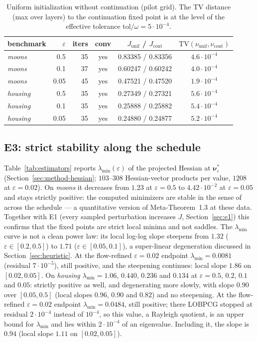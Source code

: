 \documentclass[11pt,leqno]{amsart}
\newcommand{\bnu}{\boldsymbol{\nu}}
\newcommand{\eps}{\varepsilon}
\newcommand{\TV}{\mathrm{TV}}
\numberwithin{equation}{section}
\theoremstyle{definition}
\begin{document}
\begin{table}[ht]
\centering\small
\begin{tabular}{l r rc c c}
\toprule
benchmark & $\eps$ & iters & conv & $J_{\mathrm{unif}}$ / $J_{\mathrm{cont}}$ &
$\TV(\nu_{\mathrm{unif}},\nu_{\mathrm{cont}})$\\
\midrule
\emph{moons}   & 0.5  & 35 & yes & 0.83385 / 0.83356 & $4.6\cdot10^{-4}$\\
\emph{moons}   & 0.1  & 37 & yes & 0.60247 / 0.60242 & $4.0\cdot10^{-4}$\\
\emph{moons}   & 0.05 & 45 & yes & 0.47521 / 0.47520 & $1.9\cdot10^{-4}$\\
\emph{housing} & 0.5  & 35 & yes & 0.27349 / 0.27321 & $5.6\cdot10^{-4}$\\
\emph{housing} & 0.1  & 35 & yes & 0.25888 / 0.25882 & $5.4\cdot10^{-4}$\\
\emph{housing} & 0.05 & 35 & yes & 0.24880 / 0.24877 & $5.2\cdot10^{-4}$\\
\bottomrule
\end{tabular}
\vskip 2pt
\caption{Uniform initialization without continuation (pilot grid).  The TV
distance (max over layers) to the continuation fixed point is at the level
of the effective tolerance $\mathrm{tol}/\omega=5\cdot10^{-4}$.}
\label{tab:uniform}
\end{table}

\subsection{E3: strict stability along the schedule}
\label{sec:e3}
Table~\ref{tab:estimators} reports $\lambda_{\min}(\eps)$ of the projected
Hessian at $\bnu^*_\eps$ (Section~\ref{sec:method-hessian}; $103$--$308$
Hessian-vector products per value, $1208$ at $\eps=0.02$).  On \emph{moons} it decreases from
$1.23$ at $\eps=0.5$ to $4.42\cdot10^{-2}$ at $\eps=0.05$ and stays strictly
positive: the computed minimizers are stable in the sense
of~\cite{DaudinDelarue2025} across the schedule --- a quantitative version of
Meta-Theorem~1.3 at these data.  Together with E1 (every sampled
perturbation increases $J$, Section~\ref{sec:e1}) this confirms that the
fixed points are strict local minima and not saddles.  The $\lambda_{\min}$
curve is not a clean power law: its local log-log slope steepens from
$1.32$ ($\eps\in[0.2,0.5]$) to $1.71$ ($\eps\in[0.05,0.1]$), a super-linear
degeneration discussed in Section~\ref{sec:heuristic}.  At the flow-refined
$\eps=0.02$ endpoint $\lambda_{\min}=0.0081$ (residual $7\cdot10^{-5}$),
still positive, and the steepening continues: local slope $1.86$ on
$[0.02,0.05]$.  On \emph{housing}
$\lambda_{\min}=1.06$, $0.440$, $0.236$ and $0.134$ at $\eps=0.5$, $0.2$,
$0.1$ and $0.05$: strictly positive as well, and degenerating more slowly,
with slope $0.90$ over $[0.05,0.5]$ (local slopes $0.96$, $0.90$ and $0.82$)
and no steepening.  At the flow-refined $\eps=0.02$ endpoint
$\lambda_{\min}=0.0484$, still positive; there LOBPCG stopped at residual
$2\cdot10^{-4}$ instead of $10^{-4}$, so this value, a Rayleigh quotient, is
an upper bound for $\lambda_{\min}$ and lies within $2\cdot10^{-4}$ of an
eigenvalue.  Including it, the slope is $0.94$ (local slope $1.11$ on
$[0.02,0.05]$).
\end{document}
